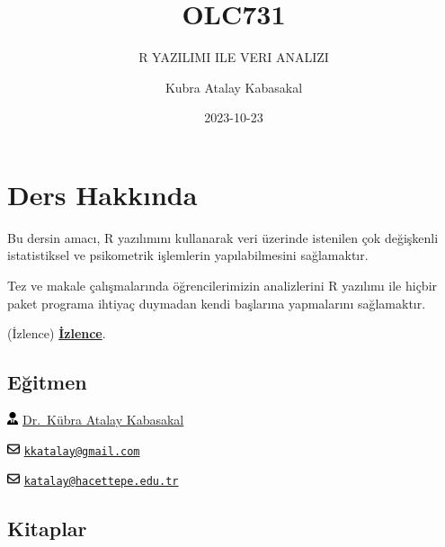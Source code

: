 \documentclass[
  oneside]{book}
\title{OLC731}
\subtitle{R YAZILIMI ILE VERI ANALIZI}
\author{Kubra Atalay Kabasakal}
\date{2023-10-23}
\begin{document}
\maketitle

{
\setcounter{tocdepth}{1}
\tableofcontents
}
\hypertarget{ders-hakkux131nda}{%
\chapter*{Ders Hakkında}\label{ders-hakkux131nda}}

Bu dersin amacı, R yazılımını kullanarak veri üzerinde istenilen çok değişkenli istatistiksel ve psikometrik işlemlerin yapılabilmesini sağlamaktır.

Tez ve makale çalışmalarında öğrencilerimizin analizlerini R yazılımı ile hiçbir paket programa ihtiyaç duymadan kendi başlarına yapmalarını sağlamaktır.

(İzlence) \href{Izlence.html}{\textbf{İzlence}}.

\hypertarget{eux11fitmen}{%
\section*{Eğitmen}\label{eux11fitmen}}

\includegraphics[width=0.88em,height=1em]{index_files/figure-latex/fa-icon-b6db0f254c80bc493dbb13c250115ecc.pdf} \href{https://avesis.hacettepe.edu.tr/katalay}{Dr.~Kübra Atalay Kabasakal}

\includegraphics[width=1em,height=1em]{index_files/figure-latex/fa-icon-f768fe0dd920858851ba0f42fb5fcbf3.pdf} \href{mailto:kkatalay@gmail.com}{\nolinkurl{kkatalay@gmail.com}}

\includegraphics[width=1em,height=1em]{index_files/figure-latex/fa-icon-f768fe0dd920858851ba0f42fb5fcbf3.pdf} \href{mailto:katalay@hacettepe.edu.tr}{\nolinkurl{katalay@hacettepe.edu.tr}}

\hypertarget{kitaplar}{%
\section*{Kitaplar}\label{kitaplar}}
\end{document}
